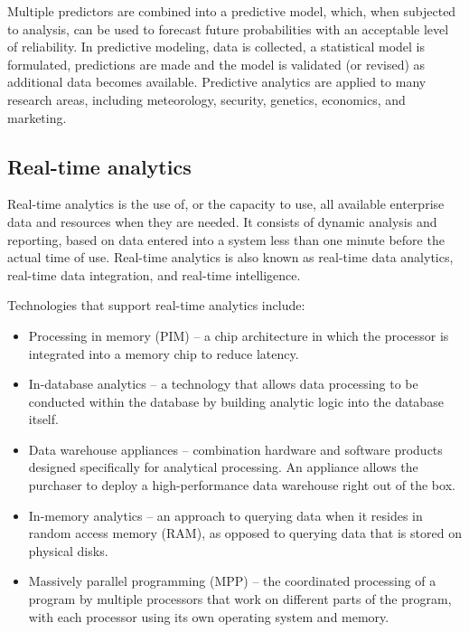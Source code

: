 Multiple predictors are combined into a predictive model, which, when subjected to analysis, can be used to forecast future probabilities with an acceptable level of reliability. In predictive modeling, data is collected, a statistical model is formulated, predictions are made and the model is validated (or revised) as additional data becomes available. Predictive analytics are applied to many research areas, including meteorology, security, genetics, economics, and marketing.


\subsection{Real-time analytics}
Real-time analytics is the use of, or the capacity to use, all available enterprise data and resources when they are needed. It consists of dynamic analysis and reporting, based on data entered into a system less than one minute before the actual time of use. Real-time analytics is also known as real-time data analytics, real-time data integration, and real-time intelligence.


Technologies that support real-time analytics include:
\begin{itemize}
\item Processing in memory (PIM) --  a chip architecture in which the processor is integrated into a memory chip to reduce latency.
\item In-database analytics -- a technology that allows data processing to be conducted within the database by building analytic logic into the database itself.
\item Data warehouse appliances -- combination hardware and software products designed specifically for analytical processing. An appliance allows the purchaser to deploy a high-performance data warehouse right out of the box.
\item In-memory analytics -- an approach to querying data when it resides in random access memory (RAM), as opposed to querying data that is stored on physical disks.
\item Massively parallel programming (MPP) -- the coordinated processing of a program by multiple processors that work on different parts of the program, with each processor using its own operating system and memory.
\end{itemize}


